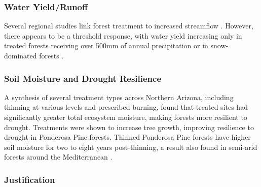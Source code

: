 \documentclass[
  number]{elsarticle}
\begin{document}
\subsubsection{Water Yield/Runoff}\label{water-yieldrunoff}

Several regional studies link forest treatment to increased streamflow
\citep{dwivedi_how_2024, biederman_streamflow_2022, broxton_subseasonal_2023}.
However, there appears to be a threshold response, with water yield
increasing only in treated forests receiving over 500mm of annual
precipitation or in snow-dominated forests
\citep{biederman_streamflow_2022, carroll_evaluating_2016, adams_ecohydrological_2012, zou_streamflow_2010, hibbert1979}.

\subsubsection{Soil Moisture and Drought
Resilience}\label{soil-moisture-and-drought-resilience}

A synthesis of several treatment types across Northern Arizona,
including thinning at various levels and prescribed burning, found that
treated sites had significantly greater total ecosystem moisture, making
forests more resilient to
drought\citep{sankey_regionalscale_2021, sankey_thinning_2022}.
Treatments were shown to increase tree growth, improving resilience to
drought in Ponderosa Pine forests\citep{rodman2024}. Thinned Ponderosa
Pine forests have higher soil moisture for two to eight years
post-thinning, a result also found in semi-arid forests around the
Mediterranean
\citep{belmonte_soil_2022, del_campo_global_2022, odonnell_vegetation_2021, del_campo_effectiveness_2019}.

\subsubsection{Justification}\label{justification}
\end{document}
